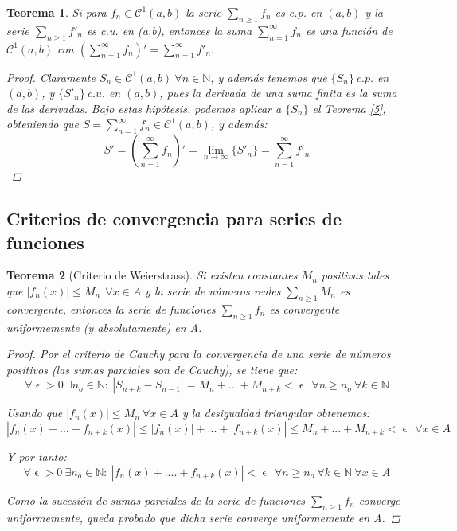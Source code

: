 \documentclass[11pt, a4paper]{article}
\let\epsilon\upvarepsilon
\theoremstyle{theorem-style}
\newtheorem{nth}{Teorema}[section]
\theoremstyle{definition-style}
\theoremstyle{remark-style}
\theoremstyle{example-style}
\begin{document}
\begin{nth} \label{9}
Si para $f_n\in \mathcal{C}^1(a,b)$  la serie  $\sum_{n\geq 1} f_n $ es  c.p.  en $(a,b)$ y  la serie  $ \sum_{n\geq 1} f'_n $ es  c.u. en (a,b), entonces la suma $\displaystyle \sum_{n=1}^{\infty} f_n $ es una funci\'on de  $\mathcal{C}^1(a,b)$ con 
$
\displaystyle \left( \sum_{n=1}^{\infty} f_n \right)' =  \sum_{n=1}^{\infty}  f'_n  .
$

\begin{proof}
Claramente $S_n \in \mathcal{C}^1(a,b)\ \forall n \in \mathbb{N}$, y además tenemos que $\{S_n\}\ c.p.$ en $(a,b)$, y $\{S'_n\}\ c.u.$ en $(a,b)$, pues la derivada de una suma finita es la suma de las derivadas. Bajo estas hipótesis, podemos aplicar a $\{S_n\}$ el \textit{Teorema \ref{5}}, obteniendo que $S = \sum_{n=1}^{\infty} f_n \in \mathcal{C}^1(a,b)$, y además:
$$S' = \left( \sum_{n=1}^{\infty} f_n \right)' = \lim_{n \to \infty} \{S'_n\} = \sum_{n=1}^{\infty} f'_n$$
\end{proof}
\end{nth}

\subsection{Criterios de convergencia para series de funciones}

\begin{nth}[Criterio de Weierstrass] \label{10}
	Si existen constantes $ M_{n} $ positivas tales que $ |f_{n}(x)| \leq M_{n}\ \ \forall x \in A$ y la serie de números reales $ \sum_{n \ge 1}M_{n} $ es convergente, entonces la serie de funciones $ \sum_{n \ge 1}f_{n} $ es convergente uniformemente (y absolutamente) en A.
	
\begin{proof}
	Por el criterio de Cauchy para la convergencia de una serie de números positivos (las sumas parciales son de Cauchy), se tiene que:
	$$ \forall \epsilon > 0\ \exists n_{o} \in \mathbb{N}:\ |S_{n+k} - S_{n-1}| = M_{n} + ... + M_{n+k} < \epsilon\ \  \forall n \geq n_{o}\ \forall k \in \mathbb{N} $$
	
	Usando que $ |f_{n}(x)| \leq M_{n}\ \forall x \in A $ y la desigualdad triangular obtenemos:
	$$ |f_{n}(x) + ... + f_{n+k}(x)| \leq |f_{n}(x)| + ... + |f_{n+k}(x)| \leq M_{n} + ... + M_{n+k} < \epsilon\ \ \forall x \in A $$
	
	Y por tanto:
	$$\forall \epsilon > 0\ \exists n_{o} \in \mathbb{N}:\ |f_{n}(x) + .... + f_{n+k}(x)| < \epsilon\ \  \forall n \geq n_{o}\ \forall k \in \mathbb{N}\ \forall x \in A $$
	
	Como la sucesión de sumas parciales de la serie de funciones $\sum_{n\ge 1} f_n$ converge uniformemente, queda probado que dicha serie converge uniformemente en A.
\end{proof}
\end{nth}
\end{document}
